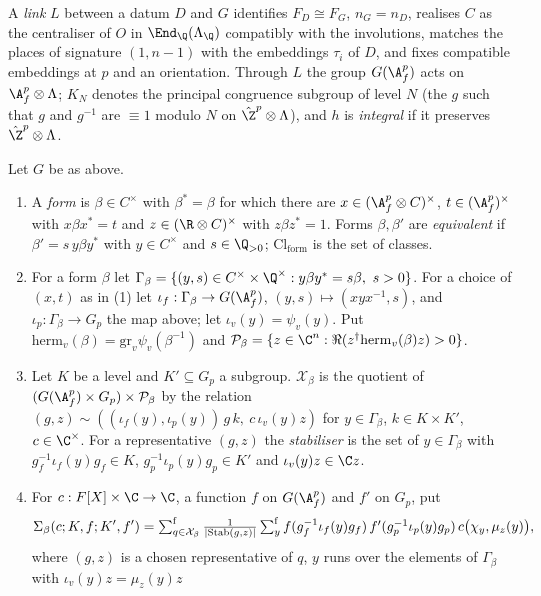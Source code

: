 A \emph{link} $L$ between a datum $D$ and $G$ identifies $F_D\cong F_G$, $n_G=n_D$, realises $C$ as the centraliser of $O$ in
$\End_\Q(\Lambda_\Q)$ compatibly with the involutions, matches the places of signature $(1,n-1)$ with the embeddings
$\tau_i$ of $D$, and fixes compatible embeddings at $p$ and an orientation. Through $L$ the group $G(\ksoneAfp)$ acts on
$\ksoneAfp\otimes\Lambda$; $K_N$ denotes the principal congruence subgroup of level $N$ (the $g$ such that $g$ and $g^{-1}$
are $\equiv1$ modulo $N$ on $\hat\Z^p\otimes\Lambda$), and $h$ is \emph{integral} if it preserves $\hat\Z^p\otimes\Lambda$.

\begin{definition}\label{pf:ks1:def-forms}
Let $G$ be as above.
\begin{enumerate}
\item A \emph{form} is $\beta\in C^\times$ with $\beta^*=\beta$ for which there are $x\in(\ksoneAfp\otimes C)^\times$,
  $t\in(\ksoneAfp)^\times$ with $x\beta x^*=t$ and $z\in(\R\otimes C)^\times$ with $z\beta z^*=1$. Forms $\beta,\beta'$ are
  \emph{equivalent} if $\beta'=s\,y\beta y^*$ with $y\in C^\times$ and $s\in\Q_{>0}$; $\mathrm{Cl}_{\mathrm{form}}$ is the set of classes.
\item For a form $\beta$ let $\Gamma_\beta=\{(y,s)\in C^\times\times\Q^\times: y\beta y^*=s\beta,\ s>0\}$. For a choice of
  $(x,t)$ as in (1) let $\iota_f:\Gamma_\beta\to G(\ksoneAfp)$, $(y,s)\mapsto(xyx^{-1},s)$, and $\iota_p:\Gamma_\beta\to G_p$
  the map above; let $\iota_v(y)=\psi_v(y)$. Put $\mathrm{herm}_v(\beta)=\mathrm{gr}_v\psi_v(\beta^{-1})$ and
  $\mathcal P_\beta=\{z\in\C^n:\Re(z^\dagger\mathrm{herm}_v(\beta)z)>0\}$.
\item Let $K$ be a level and $K'\subseteq G_p$ a subgroup. $\mathcal X_\beta$ is the quotient of
  $(G(\ksoneAfp)\times G_p)\times\mathcal P_\beta$ by the relation $(g,z)\sim((\iota_f(y),\iota_p(y))\,g\,k,\ c\,\iota_v(y)z)$
  for $y\in\Gamma_\beta$, $k\in K\times K'$, $c\in\C^\times$. For a representative $(g,z)$ the \emph{stabiliser} is the set of
  $y\in\Gamma_\beta$ with $g_f^{-1}\iota_f(y)g_f\in K$, $g_p^{-1}\iota_p(y)g_p\in K'$ and $\iota_v(y)z\in\C z$.
\item For $c:F[X]\times\C\to\C$, a function $f$ on $G(\ksoneAfp)$ and $f'$ on $G_p$, put
  \[\Sigma_\beta(c;K,f;K',f')=\textstyle\sum\nolimits^{\mathrm f}_{q\in\mathcal X_\beta}\frac{1}{|\mathrm{Stab}(g,z)|}\textstyle\sum\nolimits^{\mathrm f}_{y}
  f(g_f^{-1}\iota_f(y)g_f)\,f'(g_p^{-1}\iota_p(y)g_p)\,c\bigl(\chi_y,\mu_z(y)\bigr),\]
  where $(g,z)$ is a chosen representative of $q$, $y$ runs over the elements of $\Gamma_\beta$ with $\iota_v(y)z=\mu_z(y)z$

\end{enumerate}
\end{definition}
